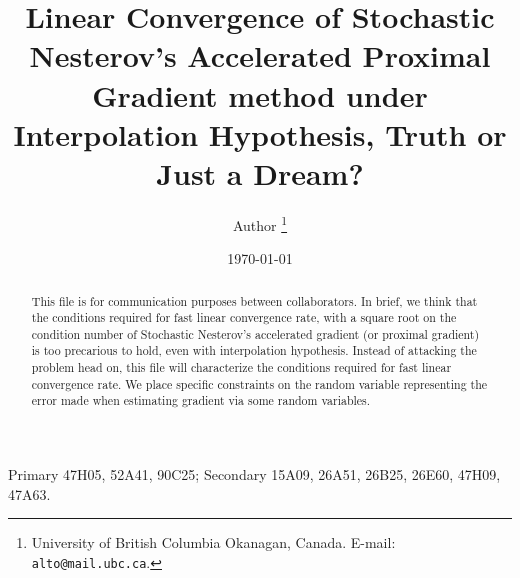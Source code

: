 \documentclass[12pt]{article}
\begin{document}
\title{{\selectfont Linear Convergence of Stochastic Nesterov's Accelerated Proximal Gradient method under Interpolation Hypothesis, Truth or Just a Dream?}}

\author{
    Author
    \thanks{
        University of British Columbia Okanagan,
        Canada. E-mail: \texttt{alto@mail.ubc.ca}.
    }
}

\date{\today}

\maketitle
{}

\begin{abstract} 
    This file is for communication purposes between collaborators. 
    In brief, we think that the conditions required for fast linear convergence rate, with a square root on the condition number of Stochastic Nesterov's accelerated gradient (or proximal gradient) is too precarious to hold, even with interpolation hypothesis. 
    Instead of attacking the problem head on, this file will characterize the conditions required for fast linear convergence rate. 
    We place specific constraints on the random variable representing the error made when estimating gradient via some random variables. 
\end{abstract}

Primary 47H05, 52A41, 90C25; Secondary 15A09, 26A51, 26B25, 26E60, 47H09, 47A63.


\end{document}
